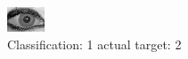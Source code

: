 \begin{figure}[h!]
\begin{center}
\includegraphics[width=0.60\columnwidth]{figures/ID2015_class_1_target_2.png}
\end{center}
\caption{ Classification: 1 actual target: 2}
\label{fig:ID2015_class_1_target_2}
\end{figure}
